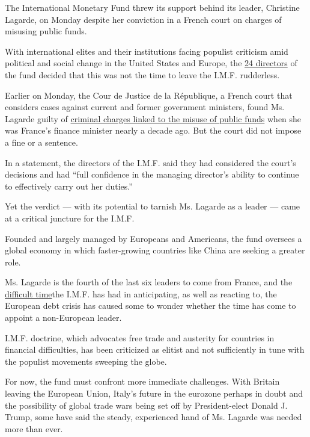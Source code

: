 The International Monetary Fund threw its support behind its leader,
Christine Lagarde, on Monday despite her conviction in a French court on
charges of misusing public funds.

With international elites and their institutions facing populist
criticism amid political and social change in the United States and
Europe, the
\href{https://www.imf.org/external/np/sec/memdir/eds.aspx}{24 directors}
of the fund decided that this was not the time to leave the I.M.F.
rudderless.

Earlier on Monday, the Cour de Justice de la République, a French court
that considers cases against current and former government ministers,
found Ms. Lagarde guilty of
\href{https://www.nytimes3xbfgragh.onion/2016/12/19/business/lagarde-imf-verdict-france-questions.html}{criminal
charges linked to the misuse of public funds} when she was France's
finance minister nearly a decade ago. But the court did not impose a
fine or a sentence.

In a statement, the directors of the I.M.F. said they had considered the
court's decisions and had ``full confidence in the managing director's
ability to continue to effectively carry out her duties.''

Yet the verdict --- with its potential to tarnish Ms. Lagarde as a
leader --- came at a critical juncture for the I.M.F.

Founded and largely managed by Europeans and Americans, the fund
oversees a global economy in which faster-growing countries like China
are seeking a greater role.

Ms. Lagarde is the fourth of the last six leaders to come from France,
and the
\href{https://www.nytimes3xbfgragh.onion/2016/10/21/business/dealbook/imf-assessment-hints-at-internal-struggles.html}{difficult
time}the I.M.F. has had in anticipating, as well as reacting to, the
European debt crisis has caused some to wonder whether the time has come
to appoint a non-European leader.

I.M.F. doctrine, which advocates free trade and austerity for countries
in financial difficulties, has been criticized as elitist and not
sufficiently in tune with the populist movements sweeping the globe.

For now, the fund must confront more immediate challenges. With Britain
leaving the European Union, Italy's future in the eurozone perhaps in
doubt and the possibility of global trade wars being set off by
President-elect Donald J. Trump, some have said the steady, experienced
hand of Ms. Lagarde was needed more than ever.

